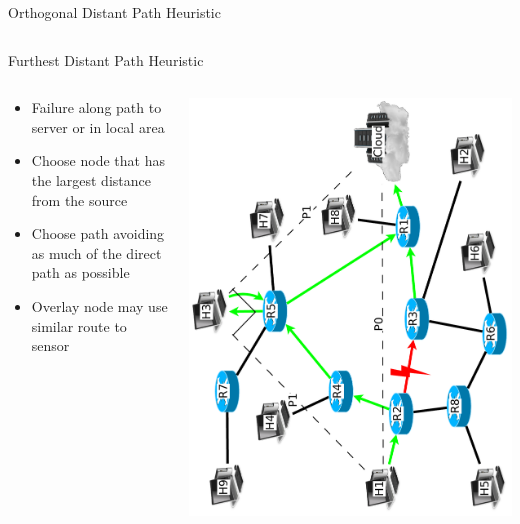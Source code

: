 \documentclass[pdftex]{beamer}
\begin{document}
\begin{frame}{Orthogonal Distant Path Heuristic}
\begin{columns}

\begin{frame}{Furthest Distant Path Heuristic}
\begin{columns}
\begin{column}{.5\textwidth}
\begin{itemize}
	\item Failure along path to server or in local area
	\item Choose node that has the largest distance from the source
	\item Choose path avoiding as much of the direct path as possible
	\item Overlay node may use similar route to sensor
\end{itemize}
\end{column}
	
\begin{column}{.5\textwidth}
\includegraphics[height=\textwidth,angle=-90]{angular_path}
\end{column}

\end{columns}
\end{frame}



\end{columns}
\end{frame}
\end{document}
